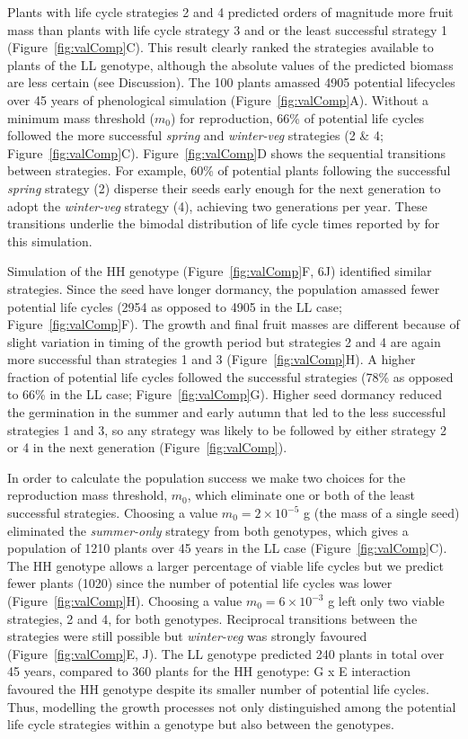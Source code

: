 Plants with life cycle strategies 2 and 4 predicted orders of magnitude more
fruit mass than plants with life cycle strategy 3 and or the least successful
strategy 1 (Figure~\ref{fig:valComp}C). This result clearly ranked the strategies available to
plants of the LL genotype, although the absolute values of the predicted biomass
are less certain (see Discussion). The 100 plants amassed 4905 potential
lifecycles over 45 years of phenological simulation (Figure~\ref{fig:valComp}A). Without a
minimum mass threshold ($m_0$) for reproduction, 66\% of potential life cycles
followed the more successful \emph{spring} and \emph{winter-veg} strategies (2
\& 4; Figure~\ref{fig:valComp}C). Figure~\ref{fig:valComp}D shows the sequential transitions between
strategies. For example, 60\% of potential plants following the successful
\emph{spring} strategy (2) disperse their seeds early enough for the next
generation to adopt the \emph{winter-veg} strategy (4), achieving two
generations per year. These transitions underlie the bimodal distribution of
life cycle times reported by \citet{burghardt_modeling_2015} for this
simulation.

Simulation of the HH genotype (Figure~\ref{fig:valComp}F, 6J) identified similar
strategies. Since the seed have longer dormancy, the population amassed
fewer potential life cycles (2954 as opposed to 4905 in the LL case;
Figure~\ref{fig:valComp}F). The growth and final fruit masses are different because of
slight variation in timing of the growth period but strategies 2 and 4
are again more successful than strategies 1 and 3 (Figure~\ref{fig:valComp}H). A higher
fraction of potential life cycles followed the successful strategies
(78\% as opposed to 66\% in the LL case; Figure~\ref{fig:valComp}G). Higher seed
dormancy reduced the germination in the summer and early autumn that led
to the less successful strategies 1 and 3, so any strategy was likely to
be followed by either strategy 2 or 4 in the next generation (Figure~\ref{fig:valComp}).

In order to calculate the population success we make two choices for the
reproduction mass threshold, \(m_{0}\), which eliminate one or both of
the least successful strategies. Choosing a value
\(m_{0} = 2 \times 10^{- 5}\) g (the mass of a single seed) eliminated
the \emph{summer-only} strategy from both genotypes, which gives a
population of 1210 plants over 45 years in the LL case (Figure~\ref{fig:valComp}C). The
HH genotype allows a larger percentage of viable life cycles but we
predict fewer plants (1020) since the number of potential life cycles
was lower (Figure~\ref{fig:valComp}H). Choosing a value \(m_{0} = 6 \times 10^{- 3}\) g
left only two viable strategies, 2 and 4, for both genotypes. Reciprocal
transitions between the strategies were still possible but
\emph{winter-veg} was strongly favoured (Figure~\ref{fig:valComp}E, J). The LL genotype
predicted 240 plants in total over 45 years, compared to 360 plants for
the HH genotype: G x E interaction favoured the HH genotype despite its
smaller number of potential life cycles. Thus, modelling the growth
processes not only distinguished among the potential life cycle
strategies within a genotype but also between the genotypes.

